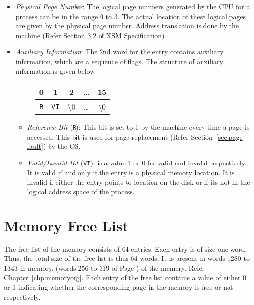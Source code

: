 \documentclass[10pt]{report}
\begin{document}
\begin{itemize}
	\item \textit{Physical Page Number}: The logical page numbers generated by the CPU for a process can be in the range 0 to 3. The actual location of these logical pages are given by the physical page number. Address translation is done by the machine (Refer Section 3.2 of XSM Specification)
	
	\item \textit{Auxiliary Information}: The 2nd word for the entry contains auxiliary information, which are a sequence of flags. The structure of auxiliary information is given below
			\begin{figure}[htp!]
		\centering
		\begin{tabular}{|c|c|c|c|c|}
		0 & 1 & 2 & \ldots & 15 \\
		\hline
		\texttt{R} & \texttt{VI} & \textbackslash 0 & \ldots &  \textbackslash 0 \\
		\hline
		\end{tabular}
		\end{figure}
	
		\begin{itemize}
			\item \textit{Reference Bit} (\texttt{R}): This bit is set to 1 by the machine every time a page is accessed. This bit is used for page replacement (Refer Section~\ref{sec:page fault}) by the OS.
			
			\item \textit{Valid/Invalid Bit} (\texttt{VI}): is a value 1 or 0 for valid and invalid respectively. It is valid if and only if the entry is a physical memory location. It is invalid if either the entry points to location on the disk or if its not in the logical address space of the process. 
		\end{itemize}

\end{itemize}
	
\section{Memory Free List}
\label{sec:mem free list}

The free list of the memory consists of 64 entries. Each entry is of size one word. Thus, the total size of the free list is thus 64 words. It is present in words 1280 to 1343 in memory. (words 256 to 319 of Page ) of the memory. Refer Chapter~\ref{chp:memoryorg}. Each entry of the free list contains a value of either 0 or 1 indicating whether the corresponding page in the memory is free or not respectively.
\end{document}
